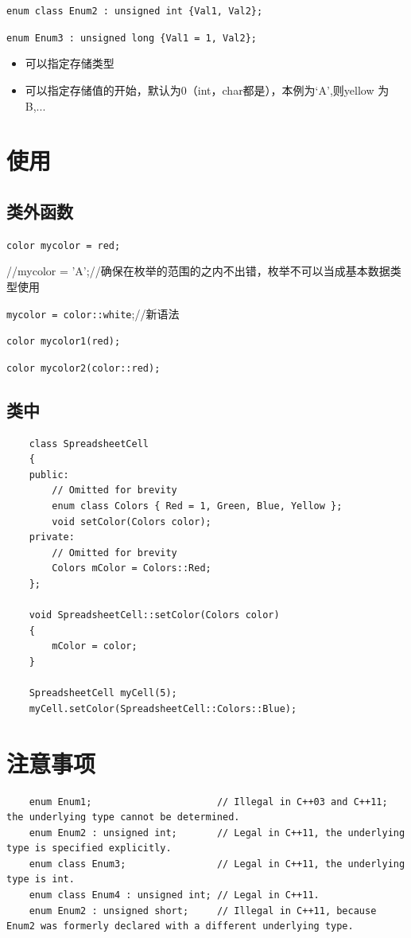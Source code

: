 \documentclass[UTF8,a4paper,12pt]{ctexbook} %
\begin{document}
		    \verb|enum class Enum2 : unsigned int {Val1, Val2};|
		    
		    \verb|enum Enum3 : unsigned long {Val1 = 1, Val2};|
		    
		    \begin{itemize}
		    	\item 可以指定存储类型
		    	\item 可以指定存储值的开始，默认为0（int，char都是），本例为‘A’,则yellow 为B,...
		    \end{itemize}
		
	\section{使用}
		\subsection{类外函数}
			\verb|color mycolor = red;|
			
			//mycolor = 'A';//确保在枚举的范围的之内不出错，枚举不可以当成基本数据类型使用
			
			\verb|mycolor = color::white|;//新语法
			
			\verb|color mycolor1(red);|
			
			\verb|color mycolor2(color::red);|
		
		\subsection{类中}
			\begin{lstlisting}
	class SpreadsheetCell
	{
	public:
		// Omitted for brevity
		enum class Colors { Red = 1, Green, Blue, Yellow };
		void setColor(Colors color);
	private:
		// Omitted for brevity
		Colors mColor = Colors::Red;
	};
	
	void SpreadsheetCell::setColor(Colors color)
	{
		mColor = color;
	}
	
	SpreadsheetCell myCell(5);
	myCell.setColor(SpreadsheetCell::Colors::Blue);
			\end{lstlisting}
	\section{注意事项}
		\begin{lstlisting}
	enum Enum1;                      // Illegal in C++03 and C++11; the underlying type cannot be determined.
	enum Enum2 : unsigned int;       // Legal in C++11, the underlying type is specified explicitly.
	enum class Enum3;                // Legal in C++11, the underlying type is int.
	enum class Enum4 : unsigned int; // Legal in C++11.
	enum Enum2 : unsigned short;     // Illegal in C++11, because Enum2 was formerly declared with a different underlying type.		
		\end{lstlisting}
\end{document}
